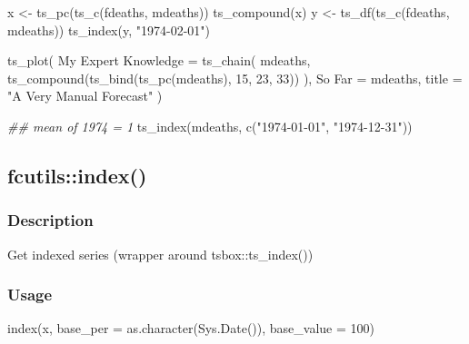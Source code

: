 \documentclass[
  letterpaper,
  DIV=11,
  numbers=noendperiod]{scrreport}
\newenvironment{Shaded}{\begin{snugshade}}{\end{snugshade}}
\newcommand{\AttributeTok}[1]{\textcolor[rgb]{0.40,0.45,0.13}{#1}}
\newcommand{\DecValTok}[1]{\textcolor[rgb]{0.68,0.00,0.00}{#1}}
\newcommand{\DocumentationTok}[1]{\textcolor[rgb]{0.37,0.37,0.37}{\textit{#1}}}
\newcommand{\FunctionTok}[1]{\textcolor[rgb]{0.28,0.35,0.67}{#1}}
\newcommand{\NormalTok}[1]{\textcolor[rgb]{0.00,0.23,0.31}{#1}}
\newcommand{\OtherTok}[1]{\textcolor[rgb]{0.00,0.23,0.31}{#1}}
\newcommand{\StringTok}[1]{\textcolor[rgb]{0.13,0.47,0.30}{#1}}
\begin{document}
\begin{Shaded}
\begin{Highlighting}[]
\NormalTok{x }\OtherTok{\textless{}{-}} \FunctionTok{ts\_pc}\NormalTok{(}\FunctionTok{ts\_c}\NormalTok{(fdeaths, mdeaths))}
\FunctionTok{ts\_compound}\NormalTok{(x)}
\NormalTok{y }\OtherTok{\textless{}{-}} \FunctionTok{ts\_df}\NormalTok{(}\FunctionTok{ts\_c}\NormalTok{(fdeaths, mdeaths))}
\FunctionTok{ts\_index}\NormalTok{(y, }\StringTok{"1974{-}02{-}01"}\NormalTok{)}

\FunctionTok{ts\_plot}\NormalTok{(}
  \StringTok{\textasciigrave{}}\AttributeTok{My Expert Knowledge}\StringTok{\textasciigrave{}} \OtherTok{=} \FunctionTok{ts\_chain}\NormalTok{(}
\NormalTok{    mdeaths,}
    \FunctionTok{ts\_compound}\NormalTok{(}\FunctionTok{ts\_bind}\NormalTok{(}\FunctionTok{ts\_pc}\NormalTok{(mdeaths), }\DecValTok{15}\NormalTok{, }\DecValTok{23}\NormalTok{, }\DecValTok{33}\NormalTok{))}
\NormalTok{  ),}
  \StringTok{\textasciigrave{}}\AttributeTok{So Far}\StringTok{\textasciigrave{}} \OtherTok{=}\NormalTok{ mdeaths,}
  \AttributeTok{title =} \StringTok{"A Very Manual Forecast"}
\NormalTok{)}

\DocumentationTok{\#\# mean of 1974 = 1}
\FunctionTok{ts\_index}\NormalTok{(mdeaths, }\FunctionTok{c}\NormalTok{(}\StringTok{"1974{-}01{-}01"}\NormalTok{, }\StringTok{"1974{-}12{-}31"}\NormalTok{))}
\end{Highlighting}
\end{Shaded}

\subsection{fcutils::index()}\label{fcutilsindex}

\subsubsection{Description}\label{description-36}

Get indexed series (wrapper around tsbox::ts\_index())

\subsubsection{Usage}\label{usage-36}

\begin{Shaded}
\begin{Highlighting}[]
\FunctionTok{index}\NormalTok{(x, }\AttributeTok{base\_per =} \FunctionTok{as.character}\NormalTok{(}\FunctionTok{Sys.Date}\NormalTok{()), }\AttributeTok{base\_value =} \DecValTok{100}\NormalTok{)}
\end{Highlighting}
\end{Shaded}
\end{document}
